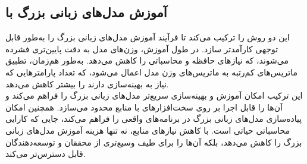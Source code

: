 \subsection{آموزش مدل‌های زبانی بزرگ با }

 این دو روش را ترکیب می‌کند تا فرآیند آموزش مدل‌های زبانی بزرگ را به‌طور قابل توجهی کارآمدتر سازد. در طول آموزش، وزن‌های مدل به دقت پایین‌تری فشرده می‌شوند، که نیازهای حافظه و محاسباتی را کاهش می‌دهد. به‌طور هم‌زمان، تطبیق ماتریس‌های کم‌رتبه به ماتریس‌های وزن مدل اعمال می‌شود، که تعداد پارامترهایی که نیاز به بهینه‌سازی دارند را بیشتر کاهش می‌دهد.
\\
این ترکیب امکان آموزش و بهینه‌سازی سریع‌تر مدل‌های زبانی بزرگ را فراهم می‌کند و آن‌ها را قابل اجرا بر روی سخت‌افزارهای با منابع محدود می‌سازد.  همچنین امکان پیاده‌سازی مدل‌های زبانی بزرگ در برنامه‌های واقعی را فراهم می‌کند، جایی که کارایی محاسباتی حیاتی است. با کاهش نیازهای منابع،  نه تنها هزینه آموزش مدل‌های زبانی بزرگ را کاهش می‌دهد، بلکه آن‌ها را برای طیف وسیع‌تری از محققان و توسعه‌دهندگان قابل دسترس‌تر می‌کند.\cite{dettmers2023qlora}

\clearpage